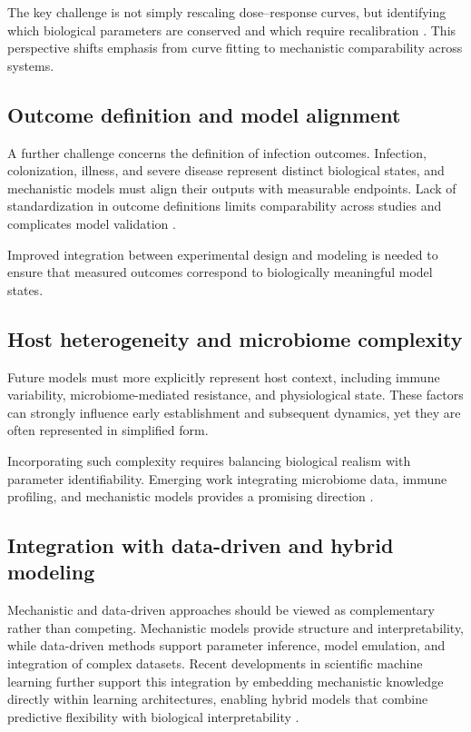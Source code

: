 \documentclass[11pt]{article}
\begin{document}
The key challenge is not simply rescaling dose--response curves, but identifying which biological parameters are conserved and which require recalibration \cite{Gostic2019Leptospira,Lecuit2007HumanListeria}. This perspective shifts emphasis from curve fitting to mechanistic comparability across systems.

\subsection{Outcome definition and model alignment}

A further challenge concerns the definition of infection outcomes. Infection, colonization, illness, and severe disease represent distinct biological states, and mechanistic models must align their outputs with measurable endpoints. Lack of standardization in outcome definitions limits comparability across studies and complicates model validation \cite{Haas2002DoseResponse,Teunis2018CampyAcuteIllness}.

Improved integration between experimental design and modeling is needed to ensure that measured outcomes correspond to biologically meaningful model states.

\subsection{Host heterogeneity and microbiome complexity}

Future models must more explicitly represent host context, including immune variability, microbiome-mediated resistance, and physiological state. These factors can strongly influence early establishment and subsequent dynamics, yet they are often represented in simplified form.

Incorporating such complexity requires balancing biological realism with parameter identifiability. Emerging work integrating microbiome data, immune profiling, and mechanistic models provides a promising direction \cite{NASEM2018MicrobiomeRisk,Thaiss2016Microbiome}.

\subsection{Integration with data-driven and hybrid modeling}

Mechanistic and data-driven approaches should be viewed as complementary rather than competing. Mechanistic models provide structure and interpretability, while data-driven methods support parameter inference, model emulation, and integration of complex datasets. Recent developments in scientific machine learning further support this integration by embedding mechanistic knowledge directly within learning architectures, enabling hybrid models that combine predictive flexibility with biological interpretability \cite{Noordijk2024SciMLSystemsBiology}.
\end{document}
